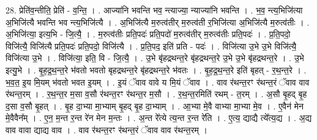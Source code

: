 \documentclass[17pt]{extarticle}
\begin{document}
28. प्रेति॑व॒न्तीति॒ प्रेति॑ - व॒न्ति॒ । . आज्या॑नि भवन्ति भव॒ न्त्याज्या॒ न्याज्या॑नि भवन्ति । . भ॒व॒ न्त्य॒भिजि॑त्या अ॒भिजि॑त्यै भवन्ति भव न्त्य॒भिजि॑त्यै । . अ॒भिजि॑त्यै म॒रुत्व॑तीर् म॒रुत्व॑ती र॒भिजि॑त्या अ॒भिजि॑त्यै म॒रुत्व॑तीः । . अ॒भिजि॑त्या॒ इत्य॒भि - जि॒त्यै॒ । . म॒रुत्व॑तीः प्रति॒पदः॑ प्रति॒पदो॑ म॒रुत्व॑तीर् म॒रुत्व॑तीः प्रति॒पदः॑ । . प्र॒ति॒पदो॒ विजि॑त्यै॒ विजि॑त्यै प्रति॒पदः॑ प्रति॒पदो॒ विजि॑त्यै । . प्र॒ति॒पद॒ इति॑ प्रति - पदः॑ । . विजि॑त्या उ॒भे उ॒भे विजि॑त्यै॒ विजि॑त्या उ॒भे । . विजि॑त्या॒ इति॒ वि - जि॒त्यै॒ । . उ॒भे बृ॑हद्रथन्त॒रे बृ॑हद्रथन्त॒रे उ॒भे उ॒भे बृ॑हद्रथन्त॒रे । . उ॒भे इत्यु॒भे । . बृ॒ह॒द्र॒थ॒न्त॒रे भ॑वतो भवतो बृहद्रथन्त॒रे बृ॑हद्रथन्त॒रे भ॑वतः । . बृ॒ह॒द्र॒थ॒न्त॒रे इति॑ बृहत् - र॒थ॒न्त॒रे । . भ॒व॒त॒ इ॒य मि॒यम् भ॑वतो भवत इ॒यम् । . इ॒यं ॅवाव वावे य मि॒यं ॅवाव । . वाव र॑थन्त॒रꣳ र॑थन्त॒रं ॅवाव वाव र॑थन्त॒रम् । . र॒थ॒न्त॒र म॒सा व॒सौ र॑थन्त॒रꣳ र॑थन्त॒र म॒सौ । . र॒थ॒न्त॒रमिति॑ रथम् - त॒रम् । . अ॒सौ बृ॒हद् बृ॒ह द॒सा व॒सौ बृ॒हत् । . बृ॒ह दा॒भ्या मा॒भ्याम् बृ॒हद् बृ॒ह दा॒भ्याम् । . आ॒भ्या मे॒वै वाभ्या मा॒भ्या मे॒व । . ए॒वैन॑ मेन मे॒वैवैन᳚म् । . ए॒न॒ म॒न्त र॒न्त रे॑न मेन म॒न्तः । . अ॒न्त रे᳚त्ये त्य॒न्त र॒न्त रे॑ति । . ए॒त्य॒ द्याद्यै त्ये᳚त्य॒द्य । . अ॒द्य वाव वावा द्याद्य वाव । . वाव र॑थन्त॒रꣳ र॑थन्त॒रं ॅवाव वाव र॑थन्त॒रम् । \newline
\end{document}
